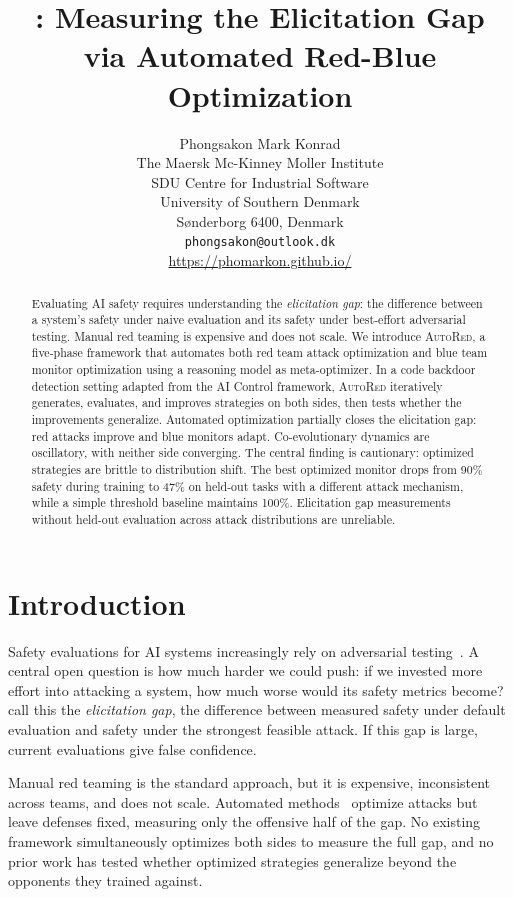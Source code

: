 \documentclass{article}
\title{\ours{}: Measuring the Elicitation Gap \\
via Automated Red-Blue Optimization}
\author{
  Phongsakon Mark Konrad \\
  The Maersk Mc-Kinney Moller Institute \\
  SDU Centre for Industrial Software \\
  University of Southern Denmark \\
  S{\o}nderborg 6400, Denmark \\
  \texttt{phongsakon@outlook.dk} \\
  \url{https://phomarkon.github.io/}
}
\newcommand{\ours}{\textsc{AutoRed}}
\begin{document}
\maketitle

\begin{abstract}
Evaluating AI safety requires understanding the \emph{elicitation gap}: the difference between a system's safety under naive evaluation and its safety under best-effort adversarial testing. Manual red teaming is expensive and does not scale. We introduce \ours{}, a five-phase framework that automates both red team attack optimization and blue team monitor optimization using a reasoning model as meta-optimizer. In a code backdoor detection setting adapted from the AI Control framework, \ours{} iteratively generates, evaluates, and improves strategies on both sides, then tests whether the improvements generalize. Automated optimization partially closes the elicitation gap: red attacks improve and blue monitors adapt. Co-evolutionary dynamics are oscillatory, with neither side converging. The central finding is cautionary: optimized strategies are brittle to distribution shift. The best optimized monitor drops from 90\% safety during training to 47\% on held-out tasks with a different attack mechanism, while a simple threshold baseline maintains 100\%. Elicitation gap measurements without held-out evaluation across attack distributions are unreliable.
\end{abstract}


\section{Introduction}

Safety evaluations for AI systems increasingly rely on adversarial testing~\citep{perez2022red, ganguli2022red, mazeika2024harmbench}. A central open question is how much harder we could push: if we invested more effort into attacking a system, how much worse would its safety metrics become? \citet{greenblatt2024ai} call this the \emph{elicitation gap}, the difference between measured safety under default evaluation and safety under the strongest feasible attack. If this gap is large, current evaluations give false confidence.

Manual red teaming is the standard approach, but it is expensive, inconsistent across teams, and does not scale. Automated methods~\citep{perez2022red, yu2024gptfuzzer, zou2023universal, liu2024autodan} optimize attacks but leave defenses fixed, measuring only the offensive half of the gap. No existing framework simultaneously optimizes both sides to measure the full gap, and no prior work has tested whether optimized strategies generalize beyond the opponents they trained against.
\end{document}
